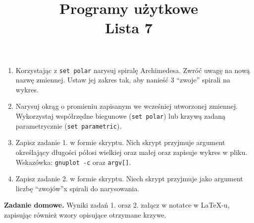 \documentclass[12pt, letterpaper]{article}
\title{Programy użytkowe \\ Lista 7}
\date{}
\begin{document}
\maketitle



\begin{enumerate}
    \item Korzystając z \texttt{set polar} narysuj spiralę Archimedesa. Zwróć uwagę na nową nazwę zmiennej. Ustaw jej zakres tak, aby nanieść 3 ``zwoje'' spirali na wykres.
    \item Narysuj okrąg o promieniu zapisanym we wcześniej utworzonej zmiennej. Wykorzystaj współrzędne biegunowe (\texttt{set polar}) lub krzywą zadaną parametrycznie (\texttt{set parametric}).
\item Zapisz zadanie 1. w formie skryptu. Nich skrypt przyjmuje argument określający długości półosi wielkiej oraz małej oraz zapisuje wykres w pliku. Wskazówka: \texttt{gnuplot -c} oraz \texttt{argv[]}.
\item Zapisz zadanie 2. w formie skryptu. Niech skrypt przyjmuje jako argument liczbę ``zwojów''x spirali do narysowania.
\end{enumerate}

\textbf{Zadanie domowe.} Wyniki zadań 1. oraz 2. załącz w notatce w \LaTeX{-u}, zapisując również wzory opisujące otrzymane krzywe.
\end{document}
